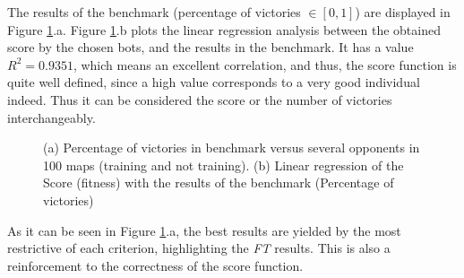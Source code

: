 \documentclass[runningheads,a4paper]{llncs}
\begin{document}
The results of the benchmark (percentage of victories $\in[0,1]$) are displayed in Figure \ref{fig:victories}.a. 
Figure \ref{fig:victories}.b plots the linear regression analysis between the obtained score by the chosen bots, and the results in the benchmark. It has a value $R^2=0.9351$, which means an excellent correlation, and thus, the score function is quite well defined, since a high value corresponds to a very good individual indeed. Thus it can be considered the score or the number of victories interchangeably.

\begin{figure}[h!tb]
\begin{center}
\end{center} 
\caption{(a) Percentage of victories in benchmark versus several opponents in 100 maps (training and not training). (b) Linear regression of the Score (fitness) with the results of the benchmark (Percentage of victories)} %
\label{fig:victories}
\end{figure}


As it can be seen in Figure \ref{fig:victories}.a, the best results are yielded by the most restrictive of each criterion, highlighting the \textit{FT} results. This is also a reinforcement to the correctness of the score function.
\end{document}
